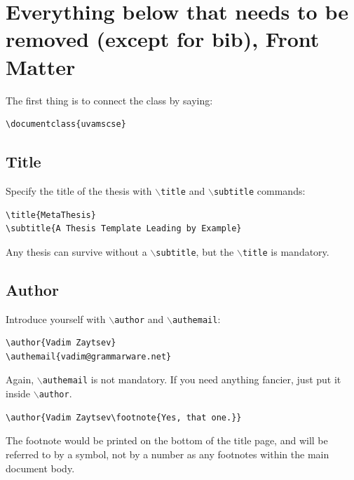 \documentclass{uvamscse}
\newcommand{\cmd}[1]{\texttt{$\backslash$#1}}
\begin{document}
\chapter{Everything below that needs to be removed (except for bib), Front Matter}

The first thing is to connect the class by saying:

\begin{snippet}
\begin{verbatim}
\documentclass{uvamscse}
\end{verbatim}
\end{snippet}

\section{Title}

Specify the title of the thesis with \cmd{title} and \cmd{subtitle} commands:

\begin{snippet}
\begin{verbatim}
\title{MetaThesis}
\subtitle{A Thesis Template Leading by Example}
\end{verbatim}
\end{snippet}

Any thesis can survive without a \cmd{subtitle}, but the \cmd{title} is mandatory.

\section{Author}

Introduce yourself with \cmd{author} and \cmd{authemail}:

\begin{snippet}
\begin{verbatim}
\author{Vadim Zaytsev}
\authemail{vadim@grammarware.net}
\end{verbatim}
\end{snippet}

Again, \cmd{authemail} is not mandatory. If you need anything fancier, just put it inside \cmd{author}.

\begin{snippet}
\begin{verbatim}
\author{Vadim Zaytsev\footnote{Yes, that one.}}
\end{verbatim}
\end{snippet}

The footnote would be printed on the bottom of the title page, and will be
referred to by a symbol, not by a number as any footnotes within the main
document body.
\end{document}
